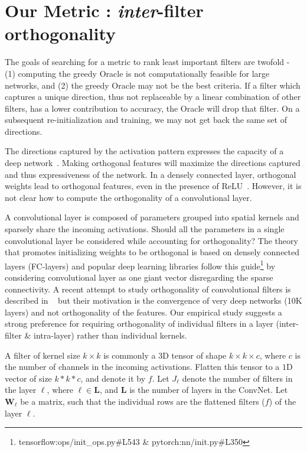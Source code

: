 \section{Our Metric : \textit{inter}-filter orthogonality} \label{sec:metric}

The goals of searching for a metric to rank least important filters are twofold - (1) computing the greedy Oracle is not computationally feasible for large networks, and (2) the greedy Oracle may not be the best criteria. If a filter which captures a unique direction, thus not replaceable by a linear combination of other filters, has a lower contribution to accuracy, the Oracle will drop that filter. On a subsequent re-initialization and training, we may not get back the same set of directions.

The directions captured by the activation pattern expresses the capacity of a deep network~\cite{Raghu2017OnTE}. 
Making orthogonal features will maximize the directions captured and thus expressiveness of the network.
In a densely connected layer, orthogonal weights lead to orthogonal features, even in the presence of ReLU~\cite{Vorontsov2017OnOA}.
However, it is not clear how to compute the orthogonality of a convolutional layer. 

A convolutional layer is composed of parameters grouped into spatial kernels and sparsely share the incoming activations.
Should all the parameters in a single convolutional layer be considered while accounting for orthogonality?
The theory that promotes initializing weights to be orthogonal is based on densely connected layers (FC-layers) and popular deep learning libraries follow this guide\footnote{tensorflow:ops/init\_ops.py\#L543 \& pytorch:nn/init.py\#L350} by considering convolutional layer as one giant vector disregarding the sparse connectivity.
A recent attempt to study orthogonality of convolutional filters is described in ~\cite{Xiao2018DynamicalIA} but their motivation is the convergence of very deep networks (10K layers) and not orthogonality of the features.
Our empirical study suggests a strong preference for requiring orthogonality of individual filters in a layer (inter-filter \& intra-layer) rather than individual kernels.


A filter of kernel size $k\times k$ is commonly a $3$D tensor of shape $k \times k \times c$, where $c$ is the number of channels in the incoming activations.
Flatten this tensor to a $1$D vector of size $k*k*c$, and denote it by $f$.
Let $J_\ell$ denote the number of filters in the layer $\ell$, where $\ell \in \mathbf{L}$, and $\mathbf{L}$ is the number of layers in the ConvNet.
Let $\boldsymbol{W}_\ell$ be a matrix, such that the individual rows are the flattened filters ($f$) of the layer $\ell$.

